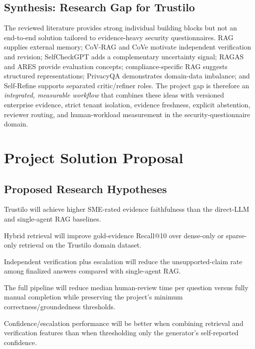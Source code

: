 \documentclass[11pt,journal,onecolumn]{IEEEtran}
\begin{document}
\subsection{Synthesis: Research Gap for Trustilo}
The reviewed literature provides strong individual building blocks but not an end-to-end solution tailored to evidence-heavy security questionnaires. RAG supplies external memory; CoV-RAG and CoVe motivate independent verification and revision; SelfCheckGPT adds a complementary uncertainty signal; RAGAS and ARES provide evaluation concepts; compliance-specific RAG suggests structured representations; PrivacyQA demonstrates domain-data imbalance; and Self-Refine supports separated critic/refiner roles. The project gap is therefore an \emph{integrated, measurable workflow} that combines these ideas with versioned enterprise evidence, strict tenant isolation, evidence freshness, explicit abstention, reviewer routing, and human-workload measurement in the security-questionnaire domain.

\section{Project Solution Proposal}

\subsection{Proposed Research Hypotheses}
\begin{description}[leftmargin=1.4cm]
\item[H1] Trustilo will achieve higher SME-rated evidence faithfulness than the direct-LLM and single-agent RAG baselines.
\item[H2] Hybrid retrieval will improve gold-evidence Recall@10 over dense-only or sparse-only retrieval on the Trustilo domain dataset.
\item[H3] Independent verification plus escalation will reduce the unsupported-claim rate among finalized answers compared with single-agent RAG.
\item[H4] The full pipeline will reduce median human-review time per question versus fully manual completion while preserving the project's minimum correctness/groundedness thresholds.
\item[H5] Confidence/escalation performance will be better when combining retrieval and verification features than when thresholding only the generator's self-reported confidence.
\end{description}
\end{document}
